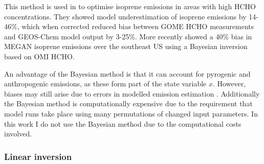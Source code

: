       This method is used in \textcite{Shim2005} to optimise isoprene emissions in areas with high HCHO concentrations. 
      They showed model underestimation of isoprene emissions by 14-46\%, which when corrected reduced bias between GOME HCHO measurements and GEOS-Chem model output by 3-25\%.
      More recently \textcite{Kaiser2018} showed a 40\% bias in MEGAN isoprene emissions over the southeast US using a Bayesian inversion based on OMI HCHO.
      
      An advantage of the Bayesian method is that it can account for pyrogenic and anthropogenic emissions, as these form part of the state variable $x$.
      However, biases may still arise due to errors in modelled emission estimation \parencite{Curci2010}.
      Additionally the Bayesian method is computationally expensive due to the requirement that model runs take place using many permutations of changed input parameters.
      In this work I do not use the Bayesian method due to the computational costs involved.
      
    \subsubsection{Linear inversion}
      \label{BioIsop:intro:top_down_linear}
      

